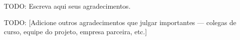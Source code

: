 \begin{agradecimentos}
TODO: Escreva aqui seus agradecimentos.

TODO: [Adicione outros agradecimentos que julgar importantes —
colegas de curso, equipe do projeto, empresa parceira, etc.]
\end{agradecimentos}


